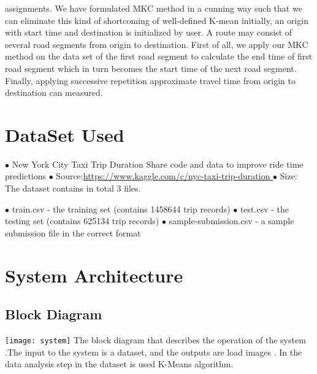 \documentclass[12pt,report]{ucdavisthesis}
\begin{document}
        assignments. We have formulated MKC method in a cunning way such that we
        can eliminate this kind of shortcoming of well-defined K-mean initially, an origin
        with start time and destination is initialized by user. A route may consist of several
        road segments from origin to destination. First of all, we apply our MKC method
        on the data set of the first road segment to calculate the end time of first road
        segment which in turn becomes the start time of the next road segment. Finally,
        applying successive repetition approximate travel time from origin to destination
        can measured.
        \newpage \section{DataSet Used}
       $\bullet$ New York City Taxi Trip Duration
       Share code and data to improve ride time predictions
        \newline $\bullet$ Source:\href {url} {https://www.kaggle.com/c/nyc-taxi-trip-duration  }
       \newline $\bullet$ Size: The dataset contains in total 3 files.
	       
	       \subitem $\bullet$
	       train.csv - the training set (contains 1458644 trip records)
	       \subitem $\bullet$
	       test.csv - the testing set (contains 625134 trip records)
	       \subitem $\bullet$
	       sample-submission.csv - a sample submission file in the correct format
	       
     
        \newpage \section{System Architecture}
        \subsection{Block Diagram}
      \texttt{[image: system]}
       \newline \hspace{2cm} The block diagram that describes the operation of the  system .The input to the system is a dataset, and the outputs are load images . In the data analysis step  in the dataset is  used K-Means algorithm.
\end{document}
